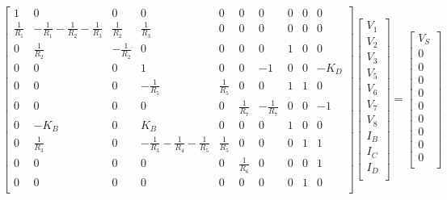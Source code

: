\[
\begin{bmatrix}
1 & 0 & 0 & 0 & 0 & 0 & 0 & 0 & 0 & 0\\

\frac{1}{R_1} & -\frac{1}{R_1} -\frac{1}{R_2} -\frac{1}{R_3} & \frac{1}{R_2} & \frac{1}{R_3} & 0 & 0 & 0 & 0 & 0 & 0\\

0 & \frac{1}{R_2} & -\frac{1}{R_2} & 0 & 0 & 0 & 0 & 1 & 0 & 0\\

0 & 0 & 0 & 1 & 0 & 0 & -1 & 0 & 0 & -K_D\\

0 & 0 & 0 & -\frac{1}{R_5} & \frac{1}{R_5} & 0 & 0 & 1 & 1 & 0\\

0 & 0 & 0 & 0 & 0 & \frac{1}{R_7} & -\frac{1}{R_7} & 0 & 0 & -1\\

0 & -K_B & 0 & K_B & 0 & 0 & 0 & 1 & 0 & 0\\

0 & \frac{1}{R_3} & 0 & -\frac{1}{R_3}-\frac{1}{R_4}-\frac{1}{R_5} & \frac{1}{R_5} & 0 & 0 & 0 & 1 & 1\\

0 & 0 & 0 & 0 & 0 & \frac{1}{R_6} & 0 & 0 & 0 & 1\\

0 & 0 & 0 & 0 & 0 & 0 & 0 & 0 & 1 & 0 \\
\end{bmatrix}
\begin{bmatrix}
V_1\\
V_2\\
V_3\\
V_5\\
V_6\\
V_7\\
V_8\\
I_B\\
I_C\\
I_D\\
\end{bmatrix}
=
\begin{bmatrix}
V_S\\
0\\
0\\
0\\
0\\
0\\
0\\
0\\
0\\
0\\
\end{bmatrix}
\]

